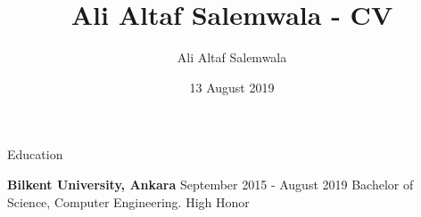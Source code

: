 \documentclass{resume} %
\title{Ali Altaf Salemwala - CV}
\author{Ali Altaf Salemwala}
\date{13 August 2019}
\begin{document}


\begin{rSection}{Education}

\textbf{Bilkent University, Ankara} \hfill September 2015 - August 2019 \newline
Bachelor of Science, Computer Engineering. \hfill High Honor

\end{rSection}

\end{document}

